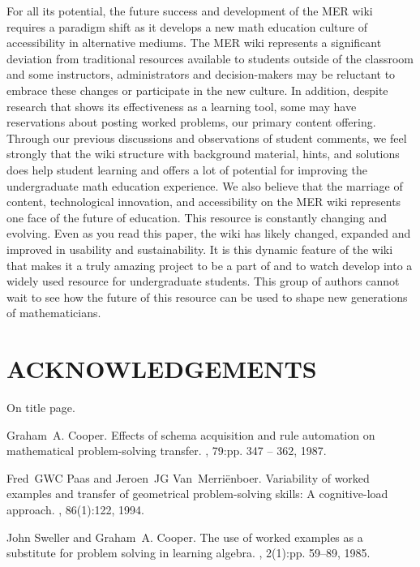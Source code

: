 \documentclass{primus}
\begin{document}
\noindent{}For all its potential, the future success and development of the MER wiki requires a paradigm shift as it develops a new math education culture of accessibility in alternative mediums. The MER wiki represents a significant deviation from traditional resources available to students outside of the classroom and some instructors, administrators and decision-makers may be reluctant to embrace these changes or participate in the new culture. In addition, despite research that shows its effectiveness as a learning tool, some may have reservations about posting worked problems, our primary content offering.  Through our previous discussions and observations of student comments, we feel strongly that the wiki structure with background material, hints, and solutions does help student learning and offers a lot of potential for improving the undergraduate math education experience.  We also believe that the marriage of content, technological innovation, and accessibility on the MER wiki represents one face of the future of education.  
This resource is constantly changing and evolving. Even as you read this paper, the wiki has likely changed, expanded and improved in usability and sustainability. It is this dynamic feature of the wiki that makes it a truly amazing project to be a part of and to watch develop into a widely used resource for undergraduate students. This group of authors cannot wait to see how the future of this resource can be used to shape new generations of mathematicians.

\section{ACKNOWLEDGEMENTS}\label{sec:Acknowledgements}
On title page.


\begin{thebibliography}{1}

Graham~A. Cooper.
\newblock Effects of schema acquisition and rule automation on mathematical
  problem-solving transfer.
, 79:pp. 347 -- 362, 1987.

Fred~GWC Paas and Jeroen~JG Van~Merri{\"e}nboer.
\newblock Variability of worked examples and transfer of geometrical
  problem-solving skills: A cognitive-load approach.
, 86(1):122, 1994.

John Sweller and Graham~A. Cooper.
\newblock The use of worked examples as a substitute for problem solving in
  learning algebra.
, 2(1):pp. 59--89, 1985.

\end{thebibliography}
\end{document}
